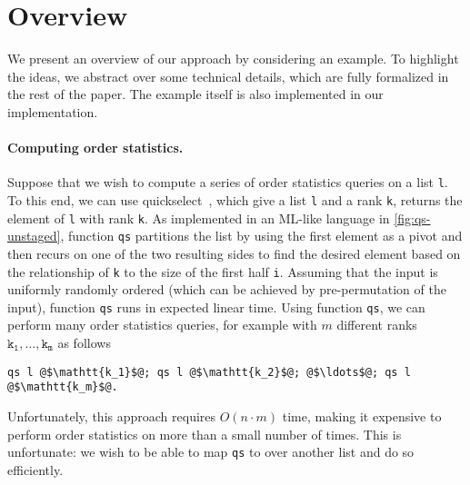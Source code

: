 
\section{Overview}
\label{sec:overview}

We present an overview of our approach by considering an example.  To
highlight the ideas, we abstract over some technical details, which
are fully formalized in the rest of the paper.  The example itself is
also implemented in our implementation.

\paragraph{Computing order statistics.}

\begin{abstrsyn}



Suppose that we wish to compute a series of order statistics queries
on a list \texttt{l}. To this end, we can use
quickselect~\cite{Hoare:1961}, which give a list \texttt{l} and a rank
\texttt{k}, returns the element of \texttt{l} with rank \texttt{k}.
As implemented in an ML-like language in \ref{fig:qs-unstaged},
function \texttt{qs} partitions the list by using the first element as
a pivot and then recurs on one of the two resulting sides to find the
desired element based on the relationship of \texttt{k} to the size of
the first half \texttt{i}.  Assuming that the input is uniformly
randomly ordered (which can be achieved by pre-permutation of the
input), function \texttt{qs} runs in expected linear time.
%
Using function \texttt{qs}, we can perform many order statistics
queries, for example with $m$ different ranks
$\mathtt{k_1},\dots,\mathtt{k_m}$ as follows
%
\begin{lstlisting}
qs l @$\mathtt{k_1}$@; qs l @$\mathtt{k_2}$@; @$\ldots$@; qs l @$\mathtt{k_m}$@.
\end{lstlisting}
%
Unfortunately, this approach requires $O(n \cdot m)$ time, making it
expensive to perform order statistics on more than a small number of
times. This is unfortunate: we wish to be able to map \texttt{qs} to
over another list and do so efficiently.


\end{abstrsyn}
